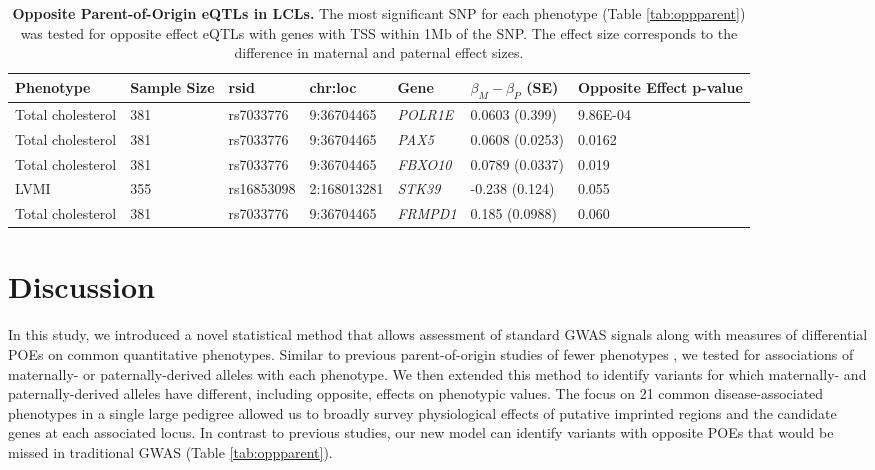 \begin{table}
\centering
\begin{adjustbox}{width={\textwidth}}
\begin{tabular}{@{}p{3cm}|p{2cm}p{2cm}p{2cm}p{2.5cm}p{2cm}p{2cm}@{}}
\toprule Phenotype & Sample Size & rsid & chr:loc & Gene & $\beta_{M}-\beta_{P}$ (SE) & Opposite Effect p-value  \\ \midrule
Total cholesterol & 381 & rs7033776	 & 9:36704465	 &\emph{POLR1E} & 	0.0603 (0.399) & 9.86E-04\\ \hline
Total cholesterol & 381 & rs7033776	 & 9:36704465	 &\emph{PAX5} & 	0.0608 (0.0253) & 	0.0162\\ \hline
Total cholesterol & 381 & rs7033776	 & 9:36704465	 &\emph{FBXO10} & 	0.0789 (0.0337) & 	0.019\\ \hline
LVMI	 & 355 & rs16853098 & 2:168013281 	 & \emph{STK39}	 &-0.238 (0.124) & 	0.055\\ \hline
Total cholesterol & 381 & rs7033776 & 	9:36704465 & 	\emph{FRMPD1} & 	0.185 (0.0988) & 	0.060 \\ \bottomrule
\end{tabular}
\end{adjustbox}
\caption[Opposite Parent-of-Origin eQTLs in LCLs. ]{\textbf{Opposite Parent-of-Origin eQTLs in LCLs.} The most significant SNP for each phenotype (Table \ref{tab:oppparent}) was tested for opposite effect eQTLs with genes with TSS within 1Mb of the SNP. The effect size corresponds to the difference in maternal and paternal effect sizes.}
\label{tab:oppgexp}
\end{table}



\section{Discussion}\label{ch02-discussion}

In this study, we introduced a novel statistical method that allows assessment of standard GWAS signals along with measures of differential POEs on common quantitative phenotypes. Similar to previous parent-of-origin studies of fewer phenotypes \cite{Kong:2009kk,Benonisdottir:2016dz,Garg2012a}, we tested for associations of maternally- or paternally-derived alleles with each phenotype. We then extended this method to identify variants for which maternally- and paternally-derived alleles have different, including opposite, effects on phenotypic values. The focus on 21 common disease-associated phenotypes in a single large pedigree allowed us to broadly survey physiological effects of putative imprinted regions and the candidate genes at each associated locus. In contrast to previous studies, our new model can identify variants with opposite POEs that would be missed in traditional GWAS (Table \ref{tab:oppparent}). 

